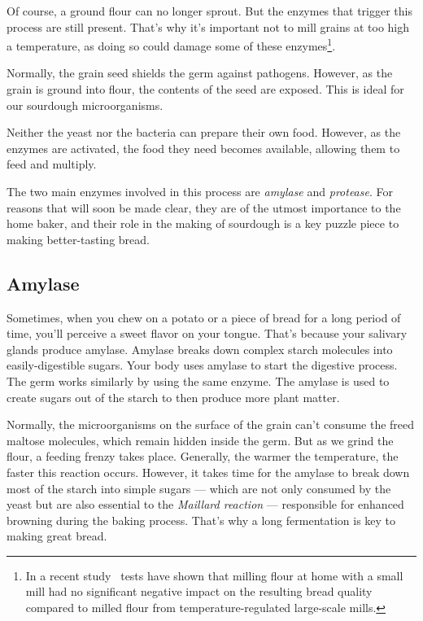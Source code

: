 Of course, a ground flour can no longer sprout. But the enzymes that
trigger this process are still present. That's why it's important not to
mill grains at too high a temperature, as doing so could damage some of
these enzymes\footnote{In a recent 
study~\cite{milling+commercial+home+mill+comparison} tests have shown that
milling flour
at home with a small mill had no significant negative impact on the resulting
bread quality compared to milled flour from temperature-regulated large-scale
mills.}.

Normally, the grain seed shields the germ against pathogens. However, as the
grain is ground into flour, the contents of the seed are exposed. This is ideal
for our sourdough microorganisms.

Neither the yeast nor the bacteria can prepare their own food. However, as
the enzymes are activated, the food they need becomes available, allowing them
to feed and multiply.

The two main enzymes involved in this process are \emph{amylase} and
\emph{protease}. For reasons that will soon be made clear, they are of the
utmost importance to the home baker, and their role in the making of sourdough
is a key puzzle piece to making better-tasting bread.

\subsection{Amylase}

Sometimes, when you chew on a potato or a piece of bread for a long period
of time, you'll perceive a sweet flavor on your tongue. That's because your
salivary glands produce amylase. Amylase breaks down complex starch molecules
into easily-digestible sugars. Your body uses amylase to start the digestive
process. The germ works similarly by using the same enzyme. The amylase
is used to create sugars out of the starch to then produce more plant matter.

Normally,
the microorganisms on the surface of the grain can't consume the freed maltose
molecules, which remain hidden inside the germ. But as we grind the flour, a
feeding frenzy takes place.  Generally, the warmer the temperature, the faster
this reaction occurs. However, it takes time for the amylase
to break down most of the starch into simple sugars --- which are not only
consumed by the yeast but are also
essential to the \emph{Maillard reaction} --- responsible for
enhanced browning during the baking process.
That's why a long fermentation is key to making great bread.

